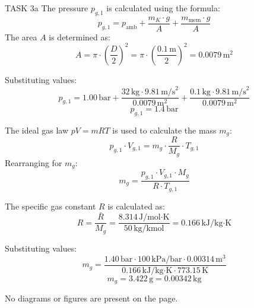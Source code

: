 TASK 3a  
The pressure \( p_{g,1} \) is calculated using the formula:  
\[
p_{g,1} = p_{\text{amb}} + \frac{m_K \cdot g}{A} + \frac{m_{\text{mem}} \cdot g}{A}
\]  
The area \( A \) is determined as:  
\[
A = \pi \cdot \left(\frac{D}{2}\right)^2 = \pi \cdot \left(\frac{0.1 \, \text{m}}{2}\right)^2 = 0.0079 \, \text{m}^2
\]  

Substituting values:  
\[
p_{g,1} = 1.00 \, \text{bar} + \frac{32 \, \text{kg} \cdot 9.81 \, \text{m/s}^2}{0.0079 \, \text{m}^2} + \frac{0.1 \, \text{kg} \cdot 9.81 \, \text{m/s}^2}{0.0079 \, \text{m}^2}
\]  
\[
p_{g,1} = 1.4 \, \text{bar}
\]  

The ideal gas law \( pV = mRT \) is used to calculate the mass \( m_g \):  
\[
p_{g,1} \cdot V_{g,1} = m_g \cdot \frac{R}{M_g} \cdot T_{g,1}
\]  
Rearranging for \( m_g \):  
\[
m_g = \frac{p_{g,1} \cdot V_{g,1} \cdot M_g}{R \cdot T_{g,1}}
\]  

The specific gas constant \( R \) is calculated as:  
\[
R = \frac{\bar{R}}{M_g} = \frac{8.314 \, \text{J/mol·K}}{50 \, \text{kg/kmol}} = 0.166 \, \text{kJ/kg·K}
\]  

Substituting values:  
\[
m_g = \frac{1.40 \, \text{bar} \cdot 100 \, \text{kPa/bar} \cdot 0.00314 \, \text{m}^3}{0.166 \, \text{kJ/kg·K} \cdot 773.15 \, \text{K}}
\]  
\[
m_g = 3.422 \, \text{g} = 0.00342 \, \text{kg}
\]  

No diagrams or figures are present on the page.